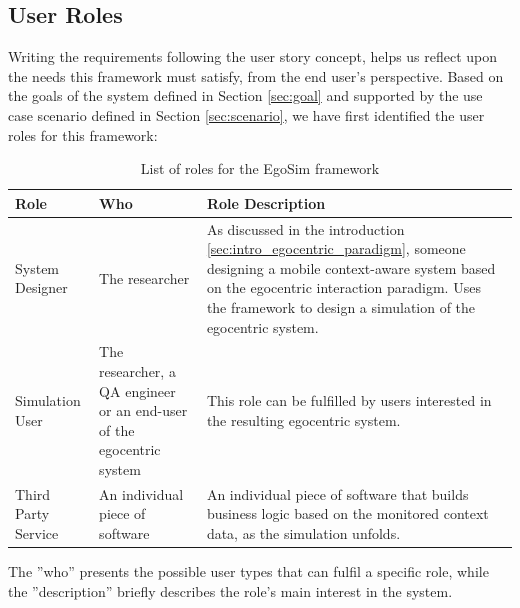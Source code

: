 \subsection{User Roles}\label{subsec:user_roles}
Writing the requirements following the user story concept, helps us reflect upon the needs this framework must satisfy, from the end user's perspective. Based on the goals of the system defined in Section \ref{sec:goal} and supported by the use case scenario defined in Section \ref{sec:scenario}, we have first identified the user roles for this framework:
\begin{table}[H]
	\begin{center}
		\small \begin{tabular*}{1.1\columnwidth}{p{3cm}p{3cm}p{5.5cm}} 
			\\ \hline \hline
			Role & Who & Role Description \\ \hline \hline

		 	System Designer & The researcher & As discussed in the introduction \ref{sec:intro_egocentric_paradigm}, someone designing a mobile context-aware system based on the egocentric interaction paradigm. Uses the framework to design a simulation of the egocentric system.\\ \hline

		 	Simulation User & The researcher, a QA engineer or an end-user of the egocentric system & This role can be fulfilled by users interested in the resulting egocentric system.\\ \hline

		 	Third Party Service & An individual piece of software & An individual piece of software that builds business logic based on the monitored context data, as the simulation unfolds.\\ \hline
		\end{tabular*}
		
		\caption{List of roles for the EgoSim framework}
		\label{table:roles}
	\end{center}
\end{table}
The ''who'' presents the possible user types that can fulfil a specific role, while the ''description'' briefly describes the role's main interest in the system.\\

